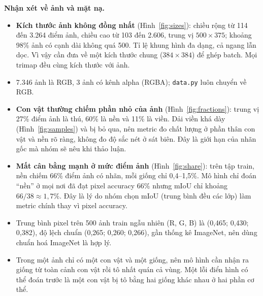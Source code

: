 \documentclass[12pt]{article}
\newcommand{\code}[1]{\texttt{#1}}
\newcommand{\st}[1]{\textbf{#1}}
\begin{document}
\textbf{Nhận xét về ảnh và mặt nạ.}
\begin{itemize}
  \item \st{Kích thước ảnh không đồng nhất} (Hình~\ref{fig:sizes}): chiều rộng từ 114 đến 3.264 điểm ảnh, chiều cao từ 103
        đến 2.606, trung vị $500\times375$; khoảng 98\% ảnh có cạnh dài không quá 500. Tỉ lệ khung hình đa dạng, cả ngang lẫn dọc.
        Vì vậy cần đưa về một kích thước chung ($384\times384$) để ghép batch. Mọi trimap đều cùng kích thước với ảnh.
  \item 7.346 ảnh là RGB, 3 ảnh có kênh alpha (RGBA); \code{data.py} luôn chuyển về RGB.
  \item \st{Con vật thường chiếm phần nhỏ của ảnh} (Hình~\ref{fig:fractions}): trung vị 27\% điểm ảnh là thú, 60\% là nền và
        11\% là viền. Dải viền khá dày (Hình~\ref{fig:samples}) và bị bỏ qua, nên metric đo chất lượng ở phần thân con vật
        và nền rõ ràng, không đo độ sắc nét ở sát biên. Đây là giới hạn của nhãn gốc mà nhóm sẽ nêu khi thảo luận.
  \item \st{Mất cân bằng mạnh ở mức điểm ảnh} (Hình~\ref{fig:share}): trên tập train, nền chiếm 66\% điểm ảnh có nhãn, mỗi
        giống chỉ 0,4--1,5\%. Mô hình chỉ đoán ``nền'' ở mọi nơi đã đạt pixel accuracy 66\% nhưng mIoU chỉ khoảng
        $66/38\approx1,7\%$. Đây là lý do nhóm chọn mIoU (trung bình đều các lớp) làm metric chính thay vì pixel accuracy.
  \item Trung bình pixel trên 500 ảnh train ngẫu nhiên (R, G, B) là (0,465; 0,430; 0,382), độ lệch chuẩn (0,265; 0,260; 0,266),
        gần thống kê ImageNet, nên dùng chuẩn hoá ImageNet là hợp lý.
  \item Trong một ảnh chỉ có một con vật và một giống, nên mô hình cần nhận ra giống từ toàn cảnh con vật rồi tô nhất quán
        cả vùng. Một lỗi điển hình có thể đoán trước là một con vật bị tô bằng hai giống khác nhau ở hai phần cơ thể.
\end{itemize}

\end{document}
